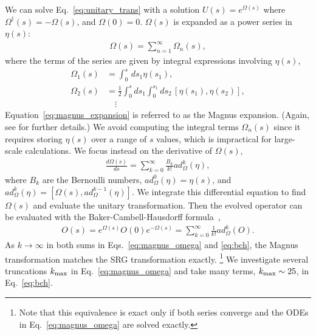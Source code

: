 \documentclass[10pt,aps,prc,floatfix,twocolumn,nofootinbib]{revtex4-1}
\begin{document}
We can solve Eq.~\eqref{eq:unitary_trans} with a solution $U(s)=e^{\Omega(s)}$ where $\Omega^{\dagger}(s) = -\Omega(s)$, and $\Omega(0) = 0$.
$\Omega(s)$ is expanded as a power series in $\eta(s)$:
%
\begin{eqnarray}
    \label{eq:magnus_expansion}
    \Omega(s) = \sum_{n=1}^{\infty} \Omega_n(s),
\end{eqnarray}
%
where the terms of the series are given by integral expressions involving $\eta(s)$,
%
\begin{align}
    \label{eq:omega_terms}
    \Omega_1(s) &= \int_0^s\, ds_1 \eta(s_1), \nonumber \\        
    \Omega_2(s) &= \frac{1}{2} \int_0^s ds_1 \int_0^{s_1} ds_2 \, [\eta(s_1), \eta(s_2)], \\
    & \quad\vdots \nonumber
\end{align}
%
Equation~\eqref{eq:magnus_expansion} is referred to as the Magnus expansion.
(Again, see \cite{Blanes:2009ab, Magnus:1954zz} for further
details.)
We avoid computing the integral terms $\Omega_n(s)$ since it requires storing $\eta(s)$ over a range of $s$ values, which is impractical for large-scale calculations.
We focus instead on the derivative of $\Omega(s)$,
%
\begin{eqnarray}
	\label{eq:magnus_omega}
	\frac{d\Omega(s)}{ds} = \sum_{k=0}^{\infty} \frac{B_k}{k!} ad_{\Omega}^{k}(\eta),
\end{eqnarray}
%
where $B_k$ are the Bernoulli numbers, $ad_{\Omega}^{0}(\eta)=\eta(s)$, and $ad_{\Omega}^{k}(\eta)=[\Omega(s),ad_{\Omega}^{k-1}(\eta)]$.
We integrate this differential equation to find $\Omega(s)$ and evaluate the unitary transformation.
Then the evolved operator can be evaluated with the Baker-Cambell-Hausdorff formula~\cite{Morris:2015yna},
%
\begin{eqnarray}
	\label{eq:bch}
	O(s) = e^{\Omega(s)} O(0) e^{-\Omega(s)} = \sum_{k=0}^{\infty} \frac{1}{k!} ad_{\Omega}^{k}(O).
\end{eqnarray}
%
As $k \rightarrow \infty$ in both sums in Eqs.~\eqref{eq:magnus_omega} and \eqref{eq:bch}, the Magnus transformation matches the SRG transformation exactly.%
\footnote{Note that this equivalence is exact only if both series converge and the ODEs in Eq.~\eqref{eq:magnus_omega} are solved exactly.}
We investigate several truncations $k_{\rm max}$ in Eq.~\eqref{eq:magnus_omega} and take many terms, $k_{\rm max} \sim 25$, in Eq.~\eqref{eq:bch}.
\end{document}
